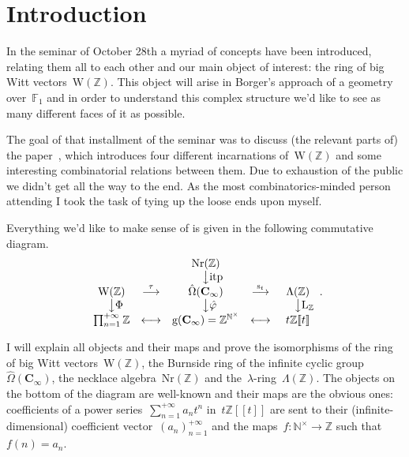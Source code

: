 \section*{Introduction}
In the seminar of October 28th a myriad of concepts have been introduced, relating them all to each other and our main object of interest: the ring of big Witt vectors~$\mathrm{W}(\mathbb{Z})$. This object will arise in Borger's approach of a geometry over~$\mathbb{F}_1$ and in order to understand this complex structure we'd like to see as many different faces of it as possible.

The goal of that installment of the seminar was to discuss (the relevant parts of) the paper~\cite{the-burnside-ring}, which introduces four different incarnations of~$\mathrm{W}(\mathbb{Z})$ and some interesting combinatorial relations between them. Due to exhaustion of the public we didn't get all the way to the end. As the most combinatorics-minded person attending I took the task of tying up the loose ends upon myself.

Everything we'd like to make sense of is given in the following commutative diagram.
\begin{equation}
  \label{equation:commutative-diagram}
  \begin{array}{ccccc}
    & & \mathrm{Nr}(\mathbb{Z}) & & \\
    & & \phantom{\textrm{itp}}\big\downarrow\textrm{itp} & & \\
    \mathrm{W}(\mathbb{Z}) & \overset{\tau}{\longrightarrow} & \hat{\Omega}(\mathbf{C}_\infty) & \overset{\mathrm{s}_t}{\longrightarrow} & \Lambda(\mathbb{Z}) \\
    \phantom{\Phi}\big\downarrow\Phi & & \phantom{\hat{\varphi}}\big\downarrow\hat{\varphi} & & \phantom{\mathrm{L}_{\mathbb{Z}}}\big\downarrow\mathrm{L}_{\mathbb{Z}} \\
    \prod_{n=1}^{+\infty}\mathbb{Z} & \longleftrightarrow & \mathrm{g}(\mathbf{C}_\infty)=\mathbb{Z}^{\mathbb{N}^\times} & \longleftrightarrow & t\mathbb{Z}[\![t]\!]
  \end{array}.
\end{equation}

I will explain all objects and their maps and prove the isomorphisms of the ring of big Witt vectors~$\mathrm{W}(\mathbb{Z})$, the Burnside ring of the infinite cyclic group~$\hat{\Omega}(\mathbf{C}_\infty)$, the necklace algebra~$\mathrm{Nr}(\mathbb{Z})$ and the~$\lambda$\nobreakdash-ring~$\Lambda(\mathbb{Z})$. The objects on the bottom of the diagram are well-known and their maps are the obvious ones: coefficients of a power series~$\sum_{n=1}^{+\infty}a_nt^n$ in~$t\mathbb{Z}[\![t]\!]$ are sent to their (infinite-dimensional) coefficient vector~$(a_n)_{n=1}^{+\infty}$ and the maps~$f\colon\mathbb{N}^\times\to\mathbb{Z}$ such that~$f(n)=a_{n}$.

